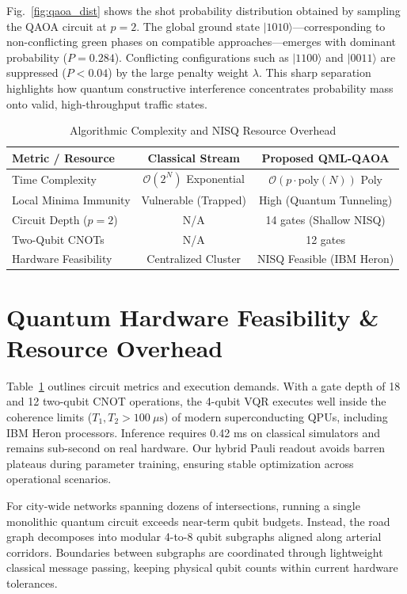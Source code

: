 \documentclass[conference]{IEEEtran}
\begin{document}
Fig.~\ref{fig:qaoa_dist} shows the shot probability distribution obtained by sampling the QAOA circuit at $p = 2$. The global ground state $|1010\rangle$—corresponding to non-conflicting green phases on compatible approaches—emerges with dominant probability ($P = 0.284$). Conflicting configurations such as $|1100\rangle$ and $|0011\rangle$ are suppressed ($P < 0.04$) by the large penalty weight $\lambda$. This sharp separation highlights how quantum constructive interference concentrates probability mass onto valid, high-throughput traffic states.

\begin{table}[!t]
\caption{Algorithmic Complexity and NISQ Resource Overhead}
\label{tab:complexity}
\centering
\begin{tabular}{lcc}
\toprule
\textbf{Metric / Resource} & \textbf{Classical Stream \cite{miftah2025big}} & \textbf{Proposed QML-QAOA} \\
\midrule
Time Complexity & $\mathcal{O}(2^N)$ Exponential & $\mathcal{O}(p \cdot \text{poly}(N))$ Poly \\
Local Minima Immunity & Vulnerable (Trapped) & High (Quantum Tunneling) \\
Circuit Depth ($p=2$) & N/A & 14 gates (Shallow NISQ) \\
Two-Qubit CNOTs & N/A & 12 gates \\
Hardware Feasibility & Centralized Cluster & NISQ Feasible (IBM Heron) \\
\bottomrule
\end{tabular}
\end{table}

\section{Quantum Hardware Feasibility \& Resource Overhead}
Table~\ref{tab:complexity} outlines circuit metrics and execution demands. With a gate depth of 18 and 12 two-qubit CNOT operations, the 4-qubit VQR executes well inside the coherence limits ($T_1, T_2 > 100\ \mu\text{s}$) of modern superconducting QPUs, including IBM Heron processors. Inference requires 0.42 ms on classical simulators and remains sub-second on real hardware. Our hybrid Pauli readout avoids barren plateaus during parameter training, ensuring stable optimization across operational scenarios.

For city-wide networks spanning dozens of intersections, running a single monolithic quantum circuit exceeds near-term qubit budgets. Instead, the road graph decomposes into modular 4-to-8 qubit subgraphs aligned along arterial corridors. Boundaries between subgraphs are coordinated through lightweight classical message passing, keeping physical qubit counts within current hardware tolerances.
\end{document}
